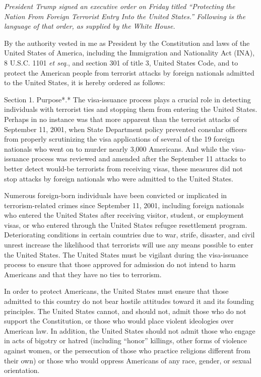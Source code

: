 \emph{President Trump signed an executive order on Friday titled
``Protecting the Nation From Foreign Terrorist Entry Into the United
States.'' Following is the language of that order, as supplied by the
White House.}

By the authority vested in me as President by the Constitution and laws
of the United States of America, including the Immigration and
Nationality Act (INA), 8 U.S.C. 1101 \emph{et seq}., and section 301 of
title 3, United States Code, and to protect the American people from
terrorist attacks by foreign nationals admitted to the United States, it
is hereby ordered as follows:

Section 1. Purpose*.* The visa-issuance process plays a crucial role in
detecting individuals with terrorist ties and stopping them from
entering the United States. Perhaps in no instance was that more
apparent than the terrorist attacks of September 11, 2001, when State
Department policy prevented consular officers from properly scrutinizing
the visa applications of several of the 19 foreign nationals who went on
to murder nearly 3,000 Americans. And while the visa-issuance process
was reviewed and amended after the September 11 attacks to better detect
would-be terrorists from receiving visas, these measures did not stop
attacks by foreign nationals who were admitted to the United States.

Numerous foreign-born individuals have been convicted or implicated in
terrorism-related crimes since September 11, 2001, including foreign
nationals who entered the United States after receiving visitor,
student, or employment visas, or who entered through the United States
refugee resettlement program. Deteriorating conditions in certain
countries due to war, strife, disaster, and civil unrest increase the
likelihood that terrorists will use any means possible to enter the
United States. The United States must be vigilant during the
visa-issuance process to ensure that those approved for admission do not
intend to harm Americans and that they have no ties to terrorism.

In order to protect Americans, the United States must ensure that those
admitted to this country do not bear hostile attitudes toward it and its
founding principles. The United States cannot, and should not, admit
those who do not support the Constitution, or those who would place
violent ideologies over American law. In addition, the United States
should not admit those who engage in acts of bigotry or hatred
(including ``honor'' killings, other forms of violence against women, or
the persecution of those who practice religions different from their
own) or those who would oppress Americans of any race, gender, or sexual
orientation.

